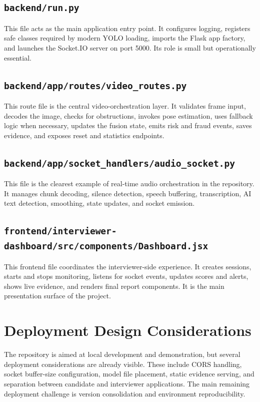 \documentclass[12pt,a4paper]{extreport}
\begin{document}
\subsection{\texttt{backend/run.py}}
This file acts as the main application entry point. It configures logging, registers safe classes required by modern YOLO loading, imports the Flask app factory, and launches the Socket.IO server on port 5000. Its role is small but operationally essential.

\subsection{\texttt{backend/app/routes/video\_routes.py}}
This route file is the central video-orchestration layer. It validates frame input, decodes the image, checks for obstructions, invokes pose estimation, uses fallback logic when necessary, updates the fusion state, emits risk and fraud events, saves evidence, and exposes reset and statistics endpoints.

\subsection{\texttt{backend/app/socket\_handlers/audio\_socket.py}}
This file is the clearest example of real-time audio orchestration in the repository. It manages chunk decoding, silence detection, speech buffering, transcription, AI text detection, smoothing, state updates, and socket emission.

\subsection{\texttt{frontend/interviewer-dashboard/src/components/Dashboard.jsx}}
This frontend file coordinates the interviewer-side experience. It creates sessions, starts and stops monitoring, listens for socket events, updates scores and alerts, shows live evidence, and renders final report components. It is the main presentation surface of the project.

\section{Deployment Design Considerations}
The repository is aimed at local development and demonstration, but several deployment considerations are already visible. These include CORS handling, socket buffer-size configuration, model file placement, static evidence serving, and separation between candidate and interviewer applications. The main remaining deployment challenge is version consolidation and environment reproducibility.
\end{document}
